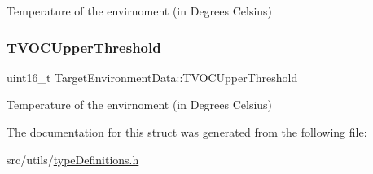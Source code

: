 Temperature of the envirnoment (in Degrees Celsius) \mbox{\label{structTargetEnvironmentData_afdddfbd81d51a1831704d85b08e9df1a}} 
\subsubsection{\texorpdfstring{T\+V\+O\+C\+Upper\+Threshold}{TVOCUpperThreshold}}
{\footnotesize\ttfamily uint16\+\_\+t Target\+Environment\+Data\+::\+T\+V\+O\+C\+Upper\+Threshold}

Temperature of the envirnoment (in Degrees Celsius) 

The documentation for this struct was generated from the following file\+:\begin{DoxyCompactItemize}
\item 
src/utils/\hyperlink{typeDefinitions_8h}{type\+Definitions.\+h}\end{DoxyCompactItemize}
